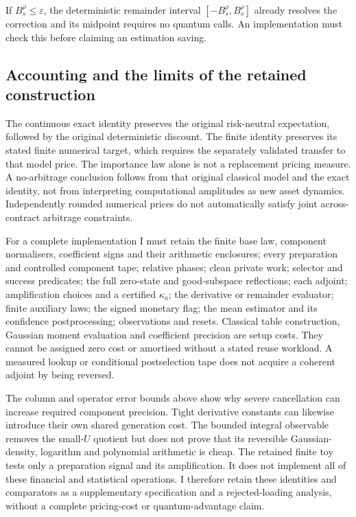 If $B_s^\rho\leq\varepsilon$, the deterministic remainder interval
$[-B_s^\rho,B_s^\rho]$ already resolves the correction and its
midpoint requires no quantum calls. An implementation must check
this before claiming an estimation saving.

\subsection{Accounting and the limits of the retained construction}

The continuous exact identity preserves the original risk-neutral
expectation, followed by the original deterministic discount.
The finite identity preserves its stated finite numerical target,
which requires the separately validated transfer to that model price.
The importance law alone is not a replacement pricing measure.
A no-arbitrage conclusion follows from that original classical
model and the exact identity, not from interpreting computational
amplitudes as new asset dynamics. Independently rounded numerical
prices do not automatically satisfy joint across-contract arbitrage
constraints.

For a complete implementation I must retain the finite base law,
component normalisers, coefficient signs and their arithmetic
enclosures; every preparation and controlled component tape;
relative phases; clean private work; selector and success predicates;
the full zero-state and good-subspace reflections; each adjoint;
amplification choices and a certified $\kappa_a$; the derivative or
remainder evaluator; finite auxiliary laws; the signed monetary
flag; the mean estimator and its confidence postprocessing;
observations and resets. Classical table construction, Gaussian
moment evaluation and coefficient precision are setup costs.
They cannot be assigned zero cost or amortised without a stated
reuse workload. A measured lookup or conditional postselection tape
does not acquire a coherent adjoint by being reversed.

The column and operator error bounds above show why severe
cancellation can increase required component precision. Tight
derivative constants can likewise introduce their own shared
generation cost. The bounded integral observable removes the
small-$U$ quotient but does not prove that its reversible
Gaussian-density, logarithm and polynomial arithmetic is cheap.
The retained finite toy tests only a preparation signal and its
amplification. It does not implement all of these financial and
statistical operations. I therefore retain these identities and
comparators as a supplementary specification and a rejected-loading
analysis, without a complete pricing-cost or quantum-advantage claim.
